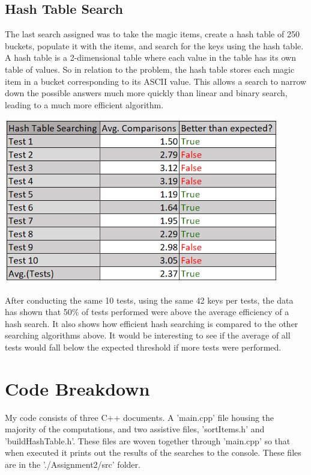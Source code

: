 \documentclass[12pt, letterpaper]{article}
\begin{document}
\subsection{Hash Table Search} \label{HshTblShs}
The last search assigned was to take the magic items, create a hash table of 250 buckets, populate it with the items, and search for the keys using the hash table.
A hash table is a 2-dimensional table where each value in the table has its own table of values.
\newline
\indent So in relation to the problem, the hash table stores each magic item in a bucket corresponding to its ASCII value.
This allows a search to narrow down the possible answers much more quickly than linear and binary search, leading to a much more efficient algorithm.
\begin{center}
   \includegraphics[width=120mm,scale=0.5]{HshSearch.png}
\end{center}
After conducting the same 10 tests, using the same 42 keys per tests, the data has shown that 50\% of tests performed were above the average efficiency of a hash search.
It also shows how efficient hash searching is compared to the other searching algorithms above.
It would be interesting to see if the average of all tests would fall below the expected threshold if more tests were performed.
\newpage

\section{Code Breakdown}
My code consists of three C++ documents. 
A 'main.cpp' file housing the majority of the computations, and two assistive files, 'sortItems.h' and 'buildHashTable.h'.
These files are woven together through 'main.cpp' so that when executed it prints out the results of the searches to the console.
These files are in the './Assignment2/src' folder.
\end{document}
